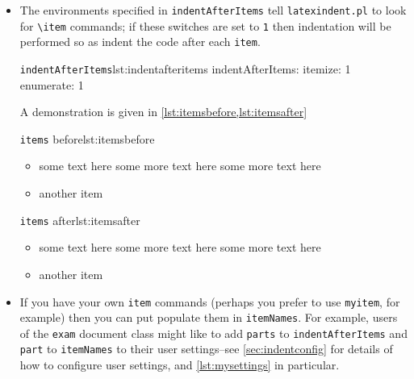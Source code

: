 \documentclass[11pt]{article}
\newcommand{\verbitem}[1]{\small\PVerb{#1}}
\begin{document}
\begin{itemize}
	\item[\verbitem{indentAfterItems}] The environments specified in \lstinline!indentAfterItems!  tell
	      \lstinline!latexindent.pl! to look for \lstinline!\item! commands; if these switches are set to \lstinline!1!
	      then indentation will be performed so as indent the code after each \lstinline!item!.
	      \begin{cmhlistings}{\lstinline!indentAfterItems!}{lst:indentafteritems}
indentAfterItems:
    itemize: 1
    enumerate: 1
	\end{cmhlistings}
	A demonstration is given in \cref{lst:itemsbefore,lst:itemsafter}

	\begin{minipage}{.5\textwidth}
		\begin{cmhlistings}[style=demo,xleftmargin=-3mm,columns=fixed]{\lstinline!items! before}{lst:itemsbefore}
\begin{itemize}
\item some text here
some more text here
some more text here
\item another item
\end{itemize}
		\end{cmhlistings}
	\end{minipage}%
	\begin{minipage}{.5\textwidth}
		\begin{cmhlistings}[style=demo,xleftmargin=-3mm,columns=fixed]{\lstinline!items! after}{lst:itemsafter}
\begin{itemize}
	\item some text here
		   some more text here
		   some more text here
	\item another item
\end{itemize}
		\end{cmhlistings}
	\end{minipage}

	\item[\verbitem{itemNames}] If you have your own \lstinline!item! commands (perhaps you
	      prefer to use \lstinline!myitem!, for example)
	      then you can put populate them in \lstinline!itemNames!.
	      For example, users of the \lstinline!exam! document class might like to add
	      \lstinline!parts! to \lstinline!indentAfterItems! and \lstinline!part! to \lstinline!itemNames!
	      to their user settings--see \vref{sec:indentconfig} for details of how to configure user settings,
	      and \vref{lst:mysettings} in particular.\label{page:examsettings}


\end{itemize}
\end{document}
